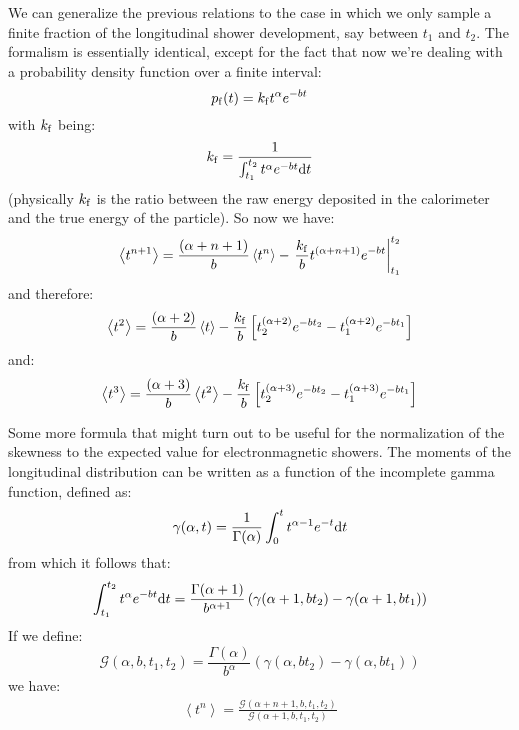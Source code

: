 \documentclass[a4paper,11pt]{article}
\newcommand{\diff}{{\rm d}}
\begin{document}
We can generalize the previous relations to the case in which we only
sample a finite fraction of the longitudinal shower development,
say between $t_1$ and $t_2$. The formalism is essentially identical, except
for the fact that now we're dealing with a probability density function
over a finite interval:
$$
p_{\rm f}(t) = k_{\rm f} t^\alpha e^{-bt}
$$
with $k_{\rm f}$ being:
$$
k_{\rm f} = \frac{1}{\int_{t_1}^{t_2} t^\alpha e^{-bt} \diff t}
$$
(physically $k_{\rm f}$ is the ratio between the raw energy deposited in the
calorimeter and the true energy of the particle). So now we have:
\begin{equation}
\left< t^{n+1} \right> = \frac{(\alpha + n + 1)}{b}\left< t^n \right> -
\left.\frac{k_{\rm f}}{b} t^{(\alpha + n + 1)} e^{-bt}\right|_{t_1}^{t_2}
\end{equation}
and therefore:
\begin{equation}
\left< t^2 \right> = \frac{(\alpha + 2)}{b}\left< t \right> -
\frac{k_{\rm f}}{b}
\left[t_2^{(\alpha + 2)} e^{-bt_2} - t_1^{(\alpha + 2)} e^{-bt_1}\right]
\end{equation}
and:
\begin{equation}
\left< t^3 \right> = \frac{(\alpha + 3)}{b}\left< t^2 \right> -
\frac{k_{\rm f}}{b}
\left[t_2^{(\alpha + 3)} e^{-bt_2} - t_1^{(\alpha + 3)} e^{-bt_1}\right]
\end{equation}

Some more formula that might turn out to be useful for the normalization
of the skewness to the expected value for electronmagnetic showers.
The moments of the longitudinal distribution can be written as a function
of the incomplete gamma function, defined as:
\begin{equation}
\gamma(\alpha, t) = \frac{1}{\Gamma(\alpha)}
\int_{0}^{t} t^{\alpha - 1} e^{-t} \diff t
\end{equation}
from which it follows that:
\begin{equation}
\int_{t_1}^{t_2} t^{\alpha} e^{-bt} \diff t =
\frac{\Gamma(\alpha+1)}{b^{\alpha+1}}
\left( \gamma(\alpha+1, bt_2) - \gamma(\alpha+1, bt_1) \right)
\end{equation}
If we define:
$$
{\mathcal G}(\alpha, b, t_1, t_2) = \frac{\Gamma(\alpha)}{b^{\alpha}}
\left( \gamma(\alpha, bt_2) - \gamma(\alpha, bt_1) \right)
$$
we have:
\begin{align}
\left< t^n \right> =
\frac{{\mathcal G}(\alpha + n + 1, b, t_1, t_2)}
     {{\mathcal G}(\alpha + 1, b, t_1, t_2)}
\end{align}
\end{document}
